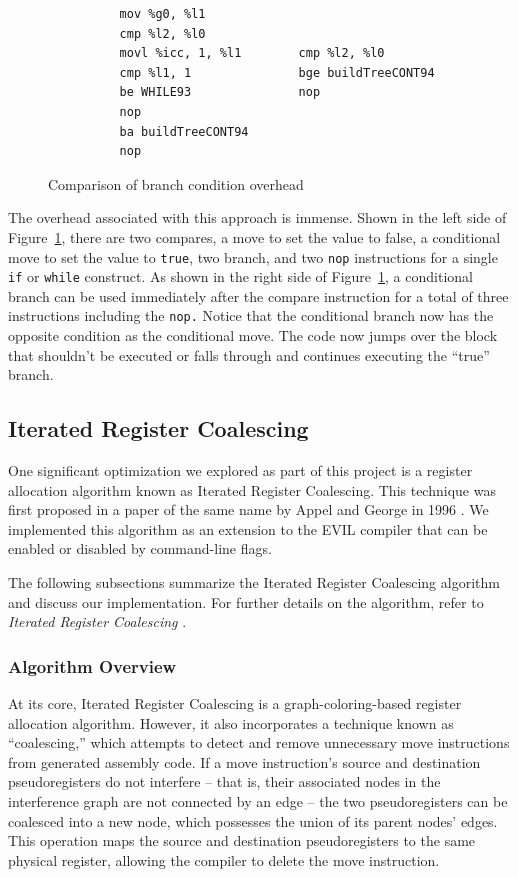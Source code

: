\documentclass[12pt]{article}
\begin{document}
\begin{figure}
\begin{verbatim}
          mov %g0, %l1
          cmp %l2, %l0
          movl %icc, 1, %l1        cmp %l2, %l0
          cmp %l1, 1               bge buildTreeCONT94
          be WHILE93               nop
          nop
          ba buildTreeCONT94
          nop
\end{verbatim}
\caption{Comparison of branch condition overhead}
\label{fig:branchOverhead}
\end{figure}

The overhead associated with this approach is immense.
Shown in the left side of Figure~\ref{fig:branchOverhead}, there are two compares, a move to set the value to false, a conditional move to set the value to {\tt true}, two branch, and two {\tt nop} instructions for a single {\tt if} or {\tt while} construct.
As shown in the right side of Figure~\ref{fig:branchOverhead}, a conditional branch can be used immediately after the compare instruction for a total of three instructions including the {\tt nop.}
Notice that the conditional branch now has the opposite condition as the conditional move.
The code now jumps over the block that shouldn’t be executed or falls through and continues executing the ``true'' branch.

\subsection{Iterated Register Coalescing}
One significant optimization we explored as part of this project is a register allocation algorithm known as Iterated Register Coalescing.
This technique was first proposed in a paper of the same name by Appel and George in 1996 \cite{iteratedRegisterCoalescing}.
We implemented this algorithm as an extension to the EVIL compiler that can be enabled or disabled by command-line flags.

The following subsections summarize the Iterated Register Coalescing algorithm and discuss our implementation.
For further details on the algorithm, refer to \emph{Iterated Register Coalescing} \cite{iteratedRegisterCoalescing}.

\subsubsection{Algorithm Overview}

At its core, Iterated Register Coalescing is a graph-coloring-based register allocation algorithm.
However, it also incorporates a technique known as “coalescing,” which attempts to detect and remove unnecessary move instructions from generated assembly code.
If a move instruction's source and destination pseudoregisters do not interfere – that is, their associated nodes in the interference graph are not connected by an edge – the two pseudoregisters can be coalesced into a new node, which possesses the union of its parent nodes' edges.
This operation maps the source and destination pseudoregisters to the same physical register, allowing the compiler to delete the move instruction.
\end{document}
